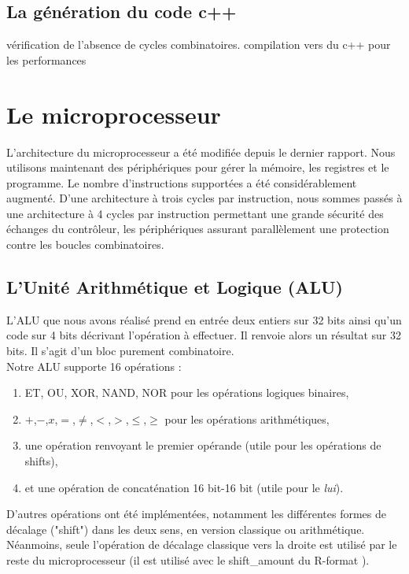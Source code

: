 \documentclass[13pt]{article}
\begin{document}
\subsection{La génération du code c++}
vérification de l'absence de cycles combinatoires.
compilation vers du c++ pour les performances


\section{Le microprocesseur}

L'architecture du microprocesseur a été modifiée depuis le dernier rapport.
Nous utilisons maintenant des périphériques pour gérer la mémoire, les registres
et le programme. Le nombre d'instructions supportées a été considérablement 
augmenté. D'une architecture à trois cycles par instruction, nous sommes passés
à une architecture à 4 cycles par instruction permettant une grande sécurité des
échanges du contrôleur, les périphériques assurant parallèlement une protection contre
les boucles combinatoires.

\subsection{L'Unité Arithmétique et Logique (ALU)}

L’ALU que nous avons réalisé prend en entrée deux entiers sur
32 bits ainsi qu’un code sur 4 bits décrivant l’opération à effectuer. Il renvoie
alors un résultat sur 32 bits. Il s’agit d’un bloc purement combinatoire.\\

Notre ALU supporte 16 opérations :

\begin{enumerate}
\item ET, OU, XOR, NAND, NOR pour les opérations logiques binaires,
\item $+$,$-$,$x$,$=$,$\neq$,$<$,$>$,$\leq$,$\geq$ pour les opérations
arithmétiques,
\item une opération renvoyant le premier opérande (utile pour les opérations de
shifts),
\item et une opération de concaténation 16 bit-16 bit (utile pour le
\textit{lui}).
\end{enumerate}  

D'autres opérations ont été implémentées, notamment les différentes formes de
décalage ("shift") dans les deux sens, en version classique ou arithmétique.
Néanmoins, seule l'opération de décalage classique vers la droite est utilisé par le
reste du microprocesseur (il est utilisé avec le shift\_amount du R-format ).
\end{document}
